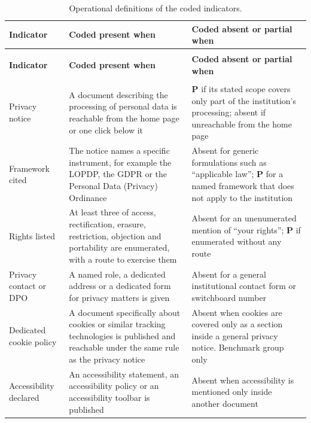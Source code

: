 \documentclass[]{interact}
\begin{document}
\footnotesize
\begin{longtable}{@{}>{\RaggedRight}p{2.7cm}>{\RaggedRight}p{4.75cm}>{\RaggedRight\arraybackslash}p{4.55cm}@{}}
	\caption{Operational definitions of the coded indicators.}\label{tab:codebook}\\
	\toprule
	\textbf{Indicator} & \textbf{Coded present when} & \textbf{Coded absent or partial when} \\
	\midrule
	\endfirsthead
	\multicolumn{3}{c}{\textit{(Table~\ref{tab:codebook}, continued)}}\\
	\toprule
	\textbf{Indicator} & \textbf{Coded present when} & \textbf{Coded absent or partial when} \\
	\midrule
	\endhead
	\midrule
	\multicolumn{3}{r}{\textit{Continued on next page}}\\
	\endfoot
	\bottomrule
	\endlastfoot
	Privacy notice & A document describing the processing of personal data is reachable from the home page or one click below it & \textbf{P} if its stated scope covers only part of the institution's processing; absent if unreachable from the home page \\
	\addlinespace
	Framework cited & The notice names a specific instrument, for example the LOPDP, the GDPR or the Personal Data (Privacy) Ordinance & Absent for generic formulations such as ``applicable law''; \textbf{P} for a named framework that does not apply to the institution \\
	\addlinespace
	Rights listed & At least three of access, rectification, erasure, restriction, objection and portability are enumerated, with a route to exercise them & Absent for an unenumerated mention of ``your rights''; \textbf{P} if enumerated without any route \\
	\addlinespace
	Privacy contact or DPO & A named role, a dedicated address or a dedicated form for privacy matters is given & Absent for a general institutional contact form or switchboard number \\
	\addlinespace
	Dedicated cookie policy & A document specifically about cookies or similar tracking technologies is published and reachable under the same rule as the privacy notice & Absent when cookies are covered only as a section inside a general privacy notice. Benchmark group only \\
	\addlinespace
	Accessibility declared & An accessibility statement, an accessibility policy or an accessibility toolbar is published & Absent when accessibility is mentioned only inside another document \\

\end{longtable}
\end{document}
